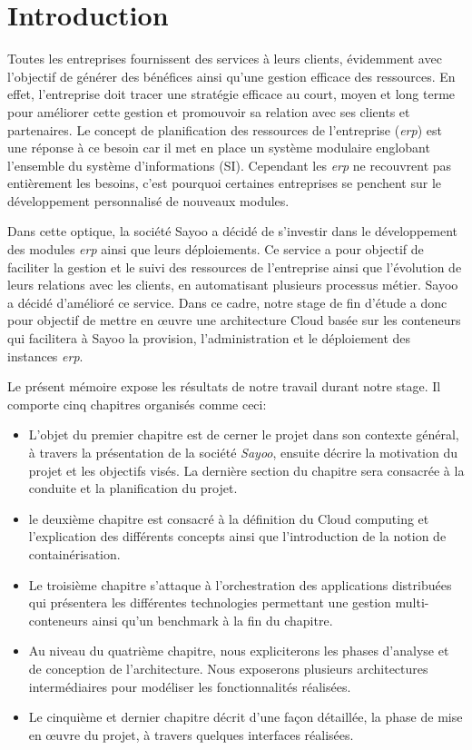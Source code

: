 \chapter*{Introduction}

\begin{onehalfspace}
Toutes les entreprises fournissent des services à leurs clients, évidemment avec l'objectif de générer des bénéfices ainsi qu'une gestion efficace des ressources. En effet, l'entreprise doit tracer une stratégie efficace au court, moyen et long terme pour améliorer cette gestion  et promouvoir sa relation avec ses clients et partenaires. Le concept de planification des ressources de l'entreprise (\emph{\acrshort{erp}}) est une réponse à ce besoin  car il met en place un système modulaire englobant l'ensemble du système d'informations (SI). Cependant les \emph{\acrshort{erp}} ne recouvrent pas entièrement les besoins, c'est pourquoi certaines entreprises se penchent sur le développement personnalisé de nouveaux modules. 


Dans cette optique, la société Sayoo a décidé de s'investir dans le développement des modules \emph{\acrshort{erp}} ainsi que leurs déploiements. Ce service a pour objectif de faciliter la gestion et le suivi des ressources de l'entreprise ainsi que l'évolution de leurs relations avec les clients, en automatisant plusieurs processus métier. Sayoo a décidé d'amélioré ce service. Dans ce cadre, notre stage de fin d'étude a donc pour objectif de mettre en œuvre une architecture Cloud basée sur les conteneurs qui facilitera à Sayoo la provision, l'administration et le déploiement des instances \emph{\acrshort{erp}}.


Le présent mémoire expose les résultats de notre travail durant notre stage. Il comporte cinq chapitres organisés comme ceci:
\begin{itemize}
\item L'objet du premier chapitre est de cerner le projet dans son contexte général, à travers la présentation de la société \emph{Sayoo}, ensuite décrire la motivation du projet et les objectifs visés. La dernière section du chapitre sera consacrée à la conduite et la planification du projet.
\item le deuxième chapitre est consacré à la définition du Cloud computing et l'explication des différents concepts ainsi que l'introduction de la notion de containérisation. 
\item Le troisième chapitre s'attaque à l'orchestration des applications distribuées qui présentera les différentes technologies permettant une gestion multi-conteneurs ainsi qu'un benchmark à la fin du chapitre.
\item Au niveau du quatrième chapitre, nous expliciterons les phases d'analyse et de conception de l'architecture. Nous exposerons plusieurs architectures intermédiaires pour modéliser les fonctionnalités réalisées.
\item Le cinquième et dernier chapitre décrit d'une façon détaillée, la phase de mise en œuvre du projet, à travers quelques interfaces réalisées.
\end{itemize}


\end{onehalfspace}
